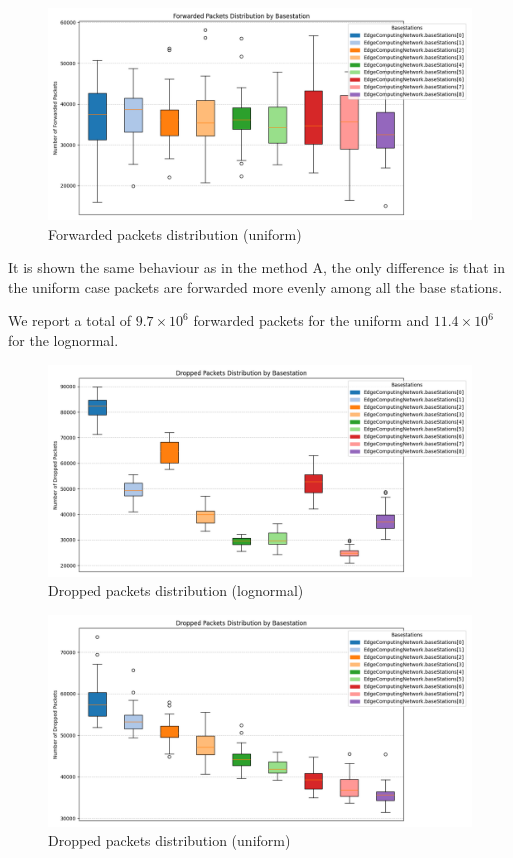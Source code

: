 \documentclass{report}
\begin{document}
\begin{figure}[H]
    \centering
    \includegraphics[width=\textwidth]{img/plots/uni_1e4_B/forwarded.png}
    \caption{Forwarded packets distribution (uniform)}
\end{figure}

It is shown the same behaviour as in the method A, the only difference is that in the uniform case packets are forwarded more evenly among all the base stations.

We report a total of $9.7\times10^6$ forwarded packets for the uniform and $11.4\times10^6$ for the lognormal.

\begin{figure}[H]
    \centering
    \includegraphics[width=\textwidth]{img/plots/log_1e4_B/dropped.png}
    \caption{Dropped packets distribution (lognormal)}
\end{figure}

\begin{figure}[H]
    \centering
    \includegraphics[width=\textwidth]{img/plots/uni_1e4_B/dropped.png}
    \caption{Dropped packets distribution (uniform)}
\end{figure}
\end{document}
